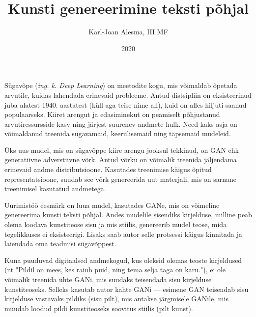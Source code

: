 \documentclass{vilgym}
\title{Kunsti genereerimine teksti põhjal}
\author{Karl-Joan Alesma, III MF}
\date{2020}
\begin{document}
	\maketitle
	\tableofcontents



	\newcommand*{\ingk}[1]{(\textit{ing. k. #1})}

	Sügavõpe \ingk{Deep Learning} on meetodite kogu, mis võimaldab õpetada arvutile, kuidas lahendada erinevaid probleeme. Antud distsipliin on eksisteerinud juba alatest 1940. aastatest (küll aga teise nime all), kuid on alles hiljuti saanud populaarseks. Kiiret arengut ja edasiminekut on peamiselt põhjustanud arvutiressursside kasv ning järjest suurenev andmete hulk. Need kaks asja on võimaldanud treenida sügavamaid, keerulisemaid ning täpsemaid mudeleid. \parencite{deeplearningbook}	 

	Üks uus mudel, mis on sügavõppe kiire arengu jooksul tekkinud, on GAN ehk generatiivne adverstiivne võrk. Antud võrku on võimalik treenida jäljendama erinevaid andme distributsioone. Kasutades treenimise käigus õpitud representatsioone, suudab see võrk genereerida uut materjali, mis on sarnane treenimisel kasutatud andmetega. \parencite{gan}

	Uurimistöö eesmärk on luua mudel, kasutades GANe, mis on võimeline genereerima kunsti teksti põhjal. Andes mudelile sisendiks kirjelduse, milline peab olema loodava kunstiteose sisu ja mis stiilis, genereerib mudel teose, mida tegelikkuses ei eksisteerigi. Lisaks saab autor selle protsessi käigus kinnitada ja laiendada oma teadmisi sügavõppest.

	Kuna puuduvad digitaalsed andmekogud, kus oleksid olemas teoste kirjeldused (nt "Pildil on mees, kes raiub puid, ning tema selja taga on karu."), ei ole võimalik treenida ühte GANi, mis suudaks teisendada sisu kirjelduse kunstiteoseks. Selleks kasutab autor kahte GANi --- esimene GAN teisendab sisu kirjelduse vastavaks pildiks (sisu \textrightarrow pilt), mis antakse järgmisele GANile, mis muudab loodud pildi kunstiteoseks soovitus stiilis (pilt \textrightarrow kunst).
\end{document}
